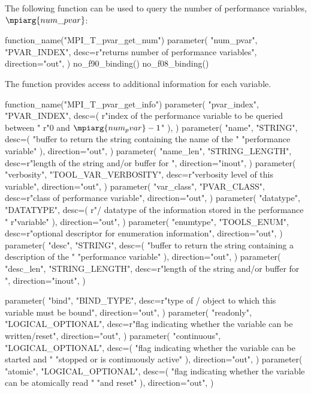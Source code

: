 The following function can be used to query the number of performance
variables, $\mpiarg{num\_pvar}$:

\begin{mpi-binding}
    function_name("MPI_T_pvar_get_num")
    parameter(
        "num_pvar",
        "PVAR_INDEX",
        desc=r"returns number of performance variables",
        direction="out",
    )
    no_f90_binding()
    no_f08_binding()
\end{mpi-binding}

The function  provides access to
additional information for each variable.


\begin{mpi-binding}
    function_name("MPI_T_pvar_get_info")
    parameter(
        "pvar_index",
        "PVAR_INDEX",
        desc=(
            r"index of the performance variable to be queried between "
            r"$0$ and $\mpiarg{num_pvar}-1$"
        ),
    )
    parameter(
        "name",
        "STRING",
        desc=(
            "buffer to return the string containing the name of the "
            "performance variable"
        ),
        direction="out",
    )
    parameter(
        "name_len",
        "STRING_LENGTH",
        desc=r"length of the string and/or buffer for ",
        direction="inout",
    )
    parameter(
        "verbosity",
        "TOOL_VAR_VERBOSITY",
        desc=r"verbosity level of this variable",
        direction="out",
    )
    parameter(
        "var_class",
        "PVAR_CLASS",
        desc=r"class of performance variable",
        direction="out",
    )
    parameter(
        "datatype",
        "DATATYPE",
        desc=(
            r"\mpi/ datatype of the information stored in the performance "
            r"variable"
        ),
        direction="out",
    )
    parameter(
        "enumtype",
        "TOOLS_ENUM",
        desc=r"optional descriptor for enumeration information",
        direction="out",
    )
    parameter(
        "desc",
        "STRING",
        desc=(
            "buffer to return the string containing a description of the "
            "performance variable"
        ),
        direction="out",
    )
    parameter(
        "desc_len",
        "STRING_LENGTH",
        desc=r"length of the string and/or buffer for ",
        direction="inout",
    )
    
    parameter(
        "bind",
        "BIND_TYPE",
        desc=r"type of \mpi/ object to which this variable must be bound",
        direction="out",
    )
    parameter(
        "readonly",
        "LOGICAL_OPTIONAL",
        desc=r"flag indicating whether the variable can be written/reset",
        direction="out",
    )
    parameter(
        "continuous",
        "LOGICAL_OPTIONAL",
        desc=(
            "flag indicating whether the variable can be started and "
            "stopped or is continuously active"
        ),
        direction="out",
    )
    parameter(
        "atomic",
        "LOGICAL_OPTIONAL",
        desc=(
            "flag indicating whether the variable can be atomically read "
            "and reset"
        ),
        direction="out",
    )
    

\end{mpi-binding}
